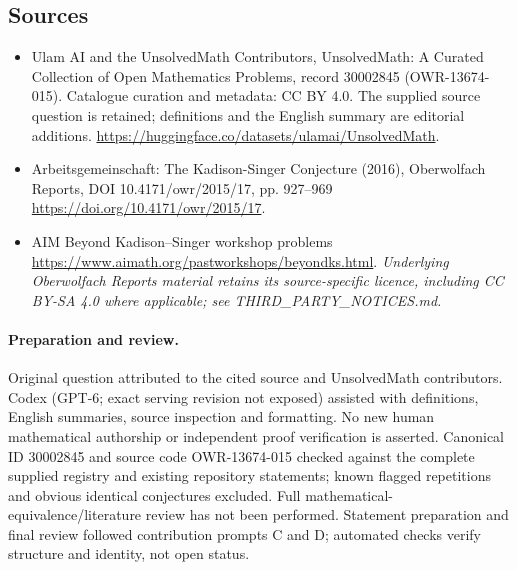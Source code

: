 \documentclass[11pt]{article}
\begin{document}
\subsection{Sources}
\begin{itemize}
\item[\hypertarget{source:30002845:1}{S1}] Ulam AI and the UnsolvedMath Contributors, UnsolvedMath: A Curated Collection of Open Mathematics Problems, record 30002845 (OWR-13674-015). Catalogue curation and metadata: CC BY 4.0. The supplied source question is retained; definitions and the English summary are editorial additions.
\url{https://huggingface.co/datasets/ulamai/UnsolvedMath}.
\item[\hypertarget{source:30002845:2}{S2}] Arbeitsgemeinschaft: The Kadison-Singer Conjecture (2016), Oberwolfach Reports, DOI 10.4171/owr/2015/17, pp. 927--969
\url{https://doi.org/10.4171/owr/2015/17}.
\item[\hypertarget{source:30002845:3}{S3}] AIM Beyond Kadison--Singer workshop problems
\url{https://www.aimath.org/pastworkshops/beyondks.html}.
\textit{Underlying Oberwolfach Reports material retains its source-specific licence, including CC BY-SA 4.0 where applicable; see THIRD\_PARTY\_NOTICES.md.}
\end{itemize}
\paragraph{Preparation and review.}
Original question attributed to the cited source and UnsolvedMath contributors. Codex (GPT-6; exact serving revision not exposed) assisted with definitions, English summaries, source inspection and formatting. No new human mathematical authorship or independent proof verification is asserted. Canonical ID 30002845 and source code OWR-13674-015 checked against the complete supplied registry and existing repository statements; known flagged repetitions and obvious identical conjectures excluded. Full mathematical-equivalence/literature review has not been performed. Statement preparation and final review followed contribution prompts C and D; automated checks verify structure and identity, not open status.
\label{end:30002845}
\end{document}
